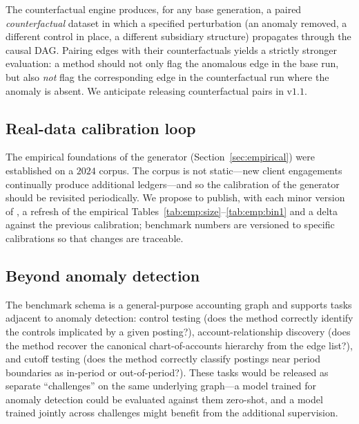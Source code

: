 The \system{} counterfactual engine produces, for any base
generation, a paired \emph{counterfactual} dataset in which a
specified perturbation (an anomaly removed, a different control in
place, a different subsidiary structure) propagates through the
causal DAG.  Pairing \bench{} edges with their counterfactuals
yields a strictly stronger evaluation: a method should not only
flag the anomalous edge in the base run, but also \emph{not} flag
the corresponding edge in the counterfactual run where the
anomaly is absent.  We anticipate releasing counterfactual pairs
in v$1.1$.

\subsection{Real-data calibration loop}
\label{sec:future-work:calibration}

The empirical foundations of the generator
(Section~\ref{sec:empirical}) were established on a $2024$
corpus.  The corpus is not static---new client engagements
continually produce additional ledgers---and so the calibration
of the generator should be revisited periodically.  We propose
to publish, with each minor version of \bench{}, a refresh of the
empirical Tables~\ref{tab:emp:size}--\ref{tab:emp:bin1} and a
delta against the previous calibration; benchmark numbers are
versioned to specific calibrations so that changes are
traceable.

\subsection{Beyond anomaly detection}
\label{sec:future-work:beyond}

The benchmark schema is a general-purpose accounting graph and
supports tasks adjacent to anomaly detection: control testing
(does the method correctly identify the controls implicated by a
given posting?), account-relationship discovery (does the method
recover the canonical chart-of-accounts hierarchy from the
edge list?), and cutoff testing (does the method correctly
classify postings near period boundaries as in-period or
out-of-period?).  These tasks would be released as separate
``challenges'' on the same underlying graph---a model trained
for anomaly detection could be evaluated against them
zero-shot, and a model trained jointly across challenges might
benefit from the additional supervision.
